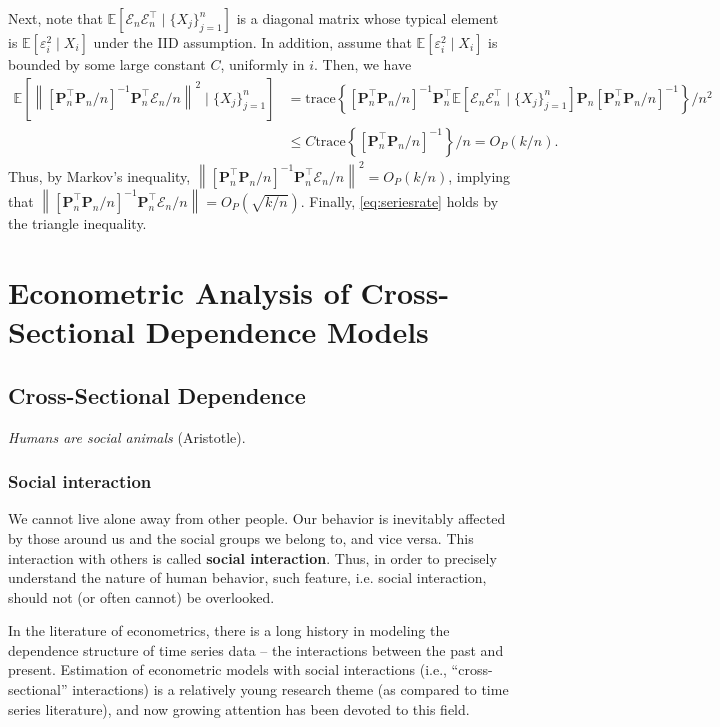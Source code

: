 \documentclass[10.5pt, A4paper, openany, uplatex]{book}
\newcommand{\mbf}{\mathbf}
\newcommand{\mcl}{\mathcal}
\newcommand{\eps}{\varepsilon}
\newcommand{\E}{\mathbb{E}}
\numberwithin{equation}{section}
\begin{document}
Next, note that $\E[\mcl{E}_n\mcl{E}_n^\top \mid \{X_j\}_{j=1}^n]$ is a diagonal matrix whose typical element is $\E[\eps_i^2 \mid X_i]$ under the IID assumption.
In addition, assume that $\E[\eps_i^2 \mid X_i]$ is bounded by some large constant $C$, uniformly in $i$.
Then, we have
\begin{align*}
	\E\left[ \left\| \left[\mbf{P}_n^\top \mbf{P}_n /n \right]^{-1}\mbf{P}_n^\top \mcl{E}_n /n \right\|^2 \mid \{X_j\}_{j=1}^n \right]
	& = \text{trace}\left\{ \left[\mbf{P}_n^\top \mbf{P}_n /n \right]^{-1}\mbf{P}_n^\top \E[\mcl{E}_n\mcl{E}_n^\top \mid \{X_j\}_{j=1}^n] \mbf{P}_n \left[\mbf{P}_n^\top \mbf{P}_n /n \right]^{-1}\right\}/n^2 \\
	& \le C \text{trace}\left\{ \left[\mbf{P}_n^\top \mbf{P}_n /n \right]^{-1} \right\}/n = O_P(k/n).
\end{align*}
Thus, by Markov's inequality, $\left\|\left[\mbf{P}_n^\top \mbf{P}_n /n \right]^{-1}\mbf{P}_n^\top \mcl{E}_n /n \right\|^2 = O_P(k/n)$, implying that $\left\|\left[\mbf{P}_n^\top \mbf{P}_n /n \right]^{-1}\mbf{P}_n^\top \mcl{E}_n /n \right\| = O_P(\sqrt{k/n})$.
Finally, \eqref{eq:seriesrate} holds by the triangle inequality.

\part{Econometric Analysis of Cross-Sectional Dependence Models}
\chapter{Cross-Sectional Dependence}
\begin{center}
	\textit{Humans are social animals} (Aristotle).
\end{center}
\section{Social interaction}
We cannot live alone away from other people.
Our behavior is inevitably affected by those around us and the social groups we belong to, and vice versa.
This interaction with others is called \textbf{social interaction}.
Thus, in order to precisely understand the nature of human behavior, such feature, i.e. social interaction, should not (or often cannot) be overlooked.

In the literature of econometrics, there is a long history in modeling the dependence structure of time series data -- the interactions between the past and present.
Estimation of econometric models with social interactions (i.e., ``cross-sectional'' interactions) is a relatively young research theme (as compared to time series literature), and now growing attention has been devoted to this field.
\end{document}
